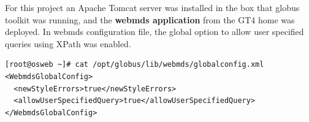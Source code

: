 For this project an Apache Tomcat server was installed in the box that globus toolkit was running, and the {\bf webmds application} from the GT4 home was deployed. In webmds configuration file, the global option to allow user specified queries using XPath was enabled.

\begin{lstlisting}
[root@osweb ~]# cat /opt/globus/lib/webmds/globalconfig.xml 
<WebmdsGlobalConfig>
  <newStyleErrors>true</newStyleErrors>
  <allowUserSpecifiedQuery>true</allowUserSpecifiedQuery>
</WebmdsGlobalConfig>
\end{lstlisting}

